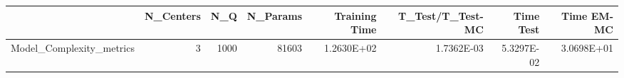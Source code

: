 \begin{tabular}{lrrrrrrr}
\toprule
{} &  N\_Centers &   N\_Q &  N\_Params &  Training Time &  T\_Test/T\_Test-MC &  Time Test &  Time EM-MC \\
\midrule
Model\_Complexity\_metrics &          3 &  1000 &     81603 &     1.2630E+02 &        1.7362E-03 & 5.3297E-02 &  3.0698E+01 \\
\bottomrule
\end{tabular}

